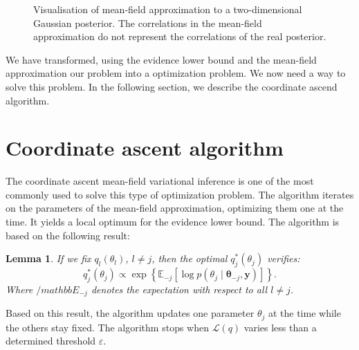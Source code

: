 \documentclass[a4paper, 11pt]{report}
\numberwithin{equation}{section}
\newtheorem{lemma}{Lemma}[section]
\begin{document}
\begin{figure}[h!]
\centering
{}
\caption{\label{fig:mean_field}Visualisation of mean-field approximation to a two-dimensional Gaussian posterior. The correlations in the mean-field approximation do not represent the correlations of the real posterior.}
\end{figure}

We have transformed, using the evidence lower bound and the mean-field approximation our problem into a optimization problem. We now need a way to solve this problem. In the following section, we describe the coordinate ascend algorithm.
\section{Coordinate ascent algorithm}
The coordinate ascent mean-field variational inference  is one of the most commonly used to solve this type of optimization problem. The algorithm iterates on the parameters of the mean-field approximation, optimizing them one at the time. It yields a local optimum for the evidence lower bound. The algorithm is based on the following result:
\begin{lemma}

If we fix $q_l(\theta_l)$, $l\neq j$, then the optimal $q^*_j(\theta_j)$ verifies:
\begin{equation*}
q^*_j(\theta_j) \propto \exp\left\lbrace\mathbb{E}_{-j}\left[\log p(\theta_j \mid \boldsymbol{\theta}_{-j}, \boldsymbol{y})\right]\right\rbrace.
\end{equation*}
Where $/mathbb{E}_{-j}$ denotes the expectation with respect to all $l \neq j$.
\end{lemma}

Based on this result, the algorithm updates one parameter $\theta_j$ at the time while the others stay fixed. The algorithm stops when $\mathcal{L}(q)$ varies less than a determined threshold $\varepsilon$.
\end{document}
